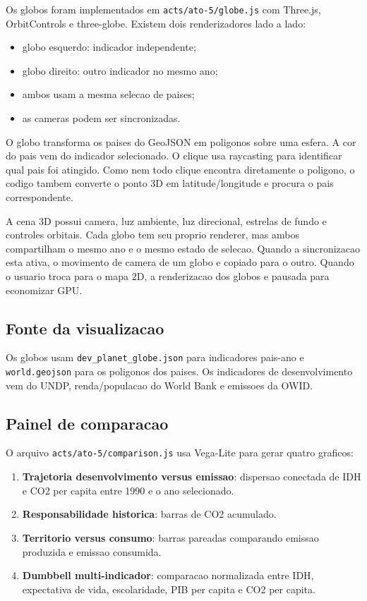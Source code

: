 \documentclass[12pt,a4paper]{article}
\begin{document}
Os globos foram implementados em \texttt{acts/ato-5/globe.js} com Three.js, OrbitControls e three-globe. Existem dois renderizadores lado a lado:

\begin{itemize}
  \item globo esquerdo: indicador independente;
  \item globo direito: outro indicador no mesmo ano;
  \item ambos usam a mesma selecao de paises;
  \item as cameras podem ser sincronizadas.
\end{itemize}

O globo transforma os paises do GeoJSON em poligonos sobre uma esfera. A cor do pais vem do indicador selecionado. O clique usa raycasting para identificar qual pais foi atingido. Como nem todo clique encontra diretamente o poligono, o codigo tambem converte o ponto 3D em latitude/longitude e procura o pais correspondente.

A cena 3D possui camera, luz ambiente, luz direcional, estrelas de fundo e controles orbitais. Cada globo tem seu proprio renderer, mas ambos compartilham o mesmo ano e o mesmo estado de selecao. Quando a sincronizacao esta ativa, o movimento de camera de um globo e copiado para o outro. Quando o usuario troca para o mapa 2D, a renderizacao dos globos e pausada para economizar GPU.

\subsection{Fonte da visualizacao}

Os globos usam \texttt{dev\_planet\_globe.json} para indicadores pais-ano e \texttt{world.geojson} para os poligonos dos paises. Os indicadores de desenvolvimento vem do UNDP, renda/populacao do World Bank e emissoes da OWID.

\subsection{Painel de comparacao}

O arquivo \texttt{acts/ato-5/comparison.js} usa Vega-Lite para gerar quatro graficos:

\begin{enumerate}
  \item \textbf{Trajetoria desenvolvimento versus emissao}: dispersao conectada de IDH e CO2 per capita entre 1990 e o ano selecionado.
  \item \textbf{Responsabilidade historica}: barras de CO2 acumulado.
  \item \textbf{Territorio versus consumo}: barras pareadas comparando emissao produzida e emissao consumida.
  \item \textbf{Dumbbell multi-indicador}: comparacao normalizada entre IDH, expectativa de vida, escolaridade, PIB per capita e CO2 per capita.
\end{enumerate}
\end{document}
